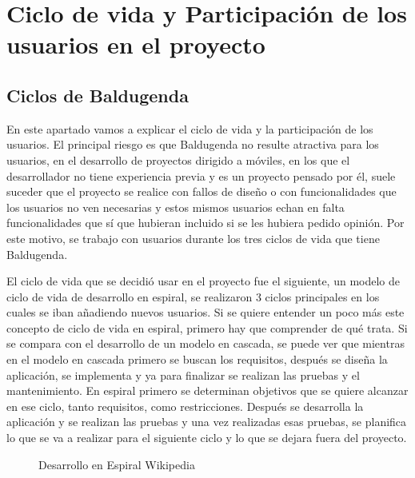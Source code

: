 \chapter{Ciclo de vida y Participación de los usuarios en el proyecto}
\label{ch:ciclo de vida}




\section{Ciclos de Baldugenda}
\label{secc:ciclos de Baldugenda}

En este apartado vamos a explicar el ciclo de vida y la participación de los usuarios. 
El principal riesgo es que Baldugenda no resulte atractiva para los usuarios, en el desarrollo de proyectos dirigido a móviles, en los que el desarrollador no tiene experiencia previa y es un proyecto pensado por él, suele suceder que el proyecto se realice con fallos de diseño o con funcionalidades que los usuarios no ven necesarias y estos mismos usuarios echan en falta funcionalidades que sí que hubieran incluido si se les hubiera pedido opinión. 
Por este motivo, se trabajo con usuarios durante los tres ciclos de vida que tiene Baldugenda.

El ciclo de vida que se decidió usar en el proyecto fue el siguiente, un modelo de ciclo de vida de desarrollo en espiral, se realizaron 3 ciclos principales en los cuales se iban añadiendo nuevos usuarios.
Si se quiere entender un poco más este concepto de ciclo de vida en espiral, primero hay que comprender de qué trata. Si se compara con el desarrollo de un modelo en cascada, se puede ver que mientras en el modelo en cascada primero se buscan los requisitos, después se diseña la aplicación, se implementa y ya para finalizar se realizan las pruebas y el mantenimiento. 
En espiral primero se determinan objetivos que se quiere alcanzar en ese ciclo, tanto requisitos, como restricciones. Después se desarrolla la aplicación y se realizan las pruebas y una vez realizadas esas pruebas, se planifica lo que se va a realizar para el siguiente ciclo y lo que se dejara fuera del proyecto. 

\begin{figure}[H] 
  \begin{center} 
    \caption{Desarrollo en Espiral Wikipedia} 
    \label{fig:Espiral} 
  \end{center} 
\end{figure}

